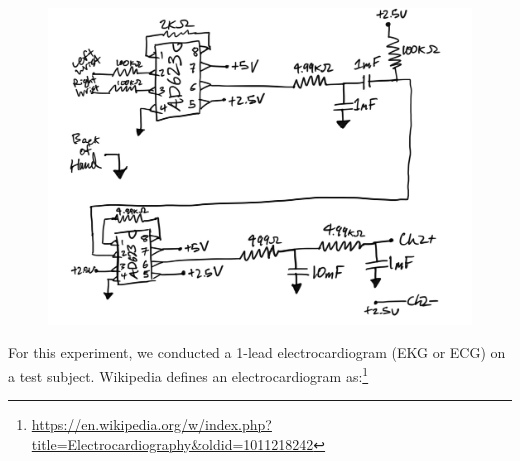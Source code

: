 \documentclass[11pt]{article}
\begin{document}
\begin{figure} [!ht]

	\centering  %
	
	\includegraphics[width=1\textwidth]{circuit_diagram.jpg}
	
	
	\caption{}
	
	\label{fig:circuit}
\end{figure}

For this experiment, we conducted a 1-lead electrocardiogram (EKG or ECG) on a test subject. Wikipedia defines an electrocardiogram as:\footnote{\url{https://en.wikipedia.org/w/index.php?title=Electrocardiography&oldid=1011218242}}
\end{document}
